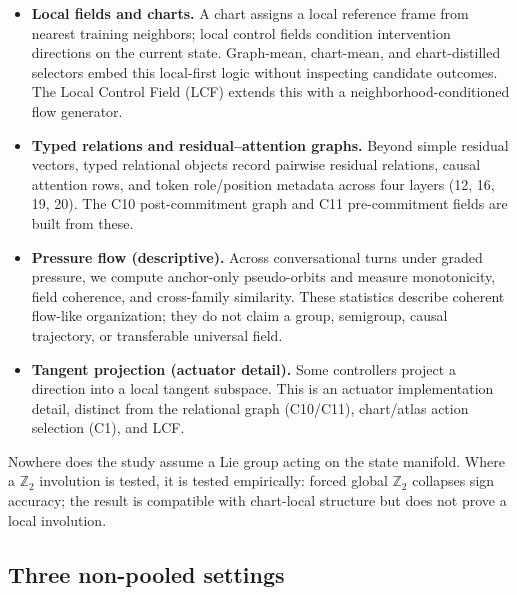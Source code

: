 \begin{itemize}
    \item \textbf{Local fields and charts.} A chart assigns a local reference frame from nearest
          training neighbors; local control fields condition intervention directions on the
          current state. Graph-mean, chart-mean, and chart-distilled selectors embed this
          local-first logic without inspecting candidate outcomes. The Local Control Field (LCF)
          extends this with a neighborhood-conditioned flow generator.
    \item \textbf{Typed relations and residual--attention graphs.} Beyond simple residual
          vectors, typed relational objects record pairwise residual relations, causal attention
          rows, and token role/position metadata across four layers (12, 16, 19, 20). The
          C10 post-commitment graph and C11 pre-commitment fields are built from these.
    \item \textbf{Pressure flow (descriptive).} Across conversational turns under graded pressure,
          we compute anchor-only pseudo-orbits and measure monotonicity, field coherence, and
          cross-family similarity. These statistics describe coherent flow-like organization;
          they do not claim a group, semigroup, causal trajectory, or transferable universal
          field.
    \item \textbf{Tangent projection (actuator detail).} Some controllers project a direction into
          a local tangent subspace. This is an actuator implementation detail, distinct from the
          relational graph (C10/C11), chart/atlas action selection (C1), and LCF.
\end{itemize}

Nowhere does the study assume a Lie group acting on the state manifold. Where a
$\mathbb{Z}_2$ involution is tested, it is tested empirically: forced global
$\mathbb{Z}_2$ collapses sign accuracy; the result is compatible with chart-local
structure but does not prove a local involution.

\subsection{Three non-pooled settings}

